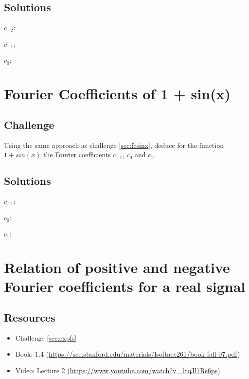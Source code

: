 \subsection*{Solutions}
$c_{-2}$:\\

$c_{-1}$:\\

$c_0$:\\




\newpage

\section{Fourier Coefficients of 1 + sin(x)}
\label{sec:fcsinxp1}

\subsection*{Challenge}
Using the same approach as challenge \ref{sec:fcsinx}, deduce for the function $1+sin(x)$ the Fourier coefficients $c_{-1}$, $c_0$ and $c_1$.

\subsection*{Solutions}
$c_{-1}$:\\

$c_0$:\\

$c_1$:\\





\newpage

\section{Relation of positive and negative Fourier coefficients for a real signal}

\subsection*{Resources}
\begin{itemize}
    \item Challenge \ref{sec:expfs}
    \item Book: 1.4 (\url{https://see.stanford.edu/materials/lsoftaee261/book-fall-07.pdf})
    \item Video: Lecture 2 (\url{https://www.youtube.com/watch?v=1rqJl7Rs6ps})
\end{itemize}

